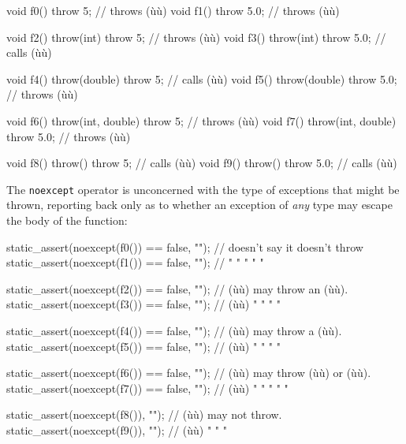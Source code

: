 \begin{emcppslisting}
void f0()                    { throw 5;   }  // throws (ù{}ù)
void f1()                    { throw 5.0; }  // throws (ù{}ù)

void f2() throw(int)         { throw 5;   }  // throws (ù{}ù)
void f3() throw(int)         { throw 5.0; }  // calls (ù{}ù)

void f4() throw(double)      { throw 5;   }  // calls (ù{}ù)
void f5() throw(double)      { throw 5.0; }  // throws (ù{}ù)

void f6() throw(int, double) { throw 5;   }  // throws (ù{}ù)
void f7() throw(int, double) { throw 5.0; }  // throws (ù{}ù)

void f8() throw()            { throw 5;   }  // calls (ù{}ù)
void f9() throw()            { throw 5.0; }  // calls (ù{}ù)
\end{emcppslisting}
    

\noindent The \lstinline!noexcept! operator is unconcerned with the type of
exceptions that might be thrown, reporting back only as to whether an
exception of \emph{any} type may escape the body of the function:

\begin{emcppslisting}
static_assert(noexcept(f0()) == false, "");  // doesn't say it doesn't throw
static_assert(noexcept(f1()) == false, "");  //   "      "   "    "      "

static_assert(noexcept(f2()) == false, "");  // (ù{}ù) may throw an (ù{}ù).
static_assert(noexcept(f3()) == false, "");  // (ù{}ù)  "    "    "   "

static_assert(noexcept(f4()) == false, "");  // (ù{}ù) may throw a (ù{}ù).
static_assert(noexcept(f5()) == false, "");  // (ù{}ù)  "    "   "    "

static_assert(noexcept(f6()) == false, "");  // (ù{}ù) may throw (ù{}ù) or (ù{}ù).
static_assert(noexcept(f7()) == false, "");  // (ù{}ù)  "    "     "    "    "

static_assert(noexcept(f8()), "");   // (ù{}ù) may not throw.
static_assert(noexcept(f9()), "");   // (ù{}ù)  "    "     "
\end{emcppslisting}
    

